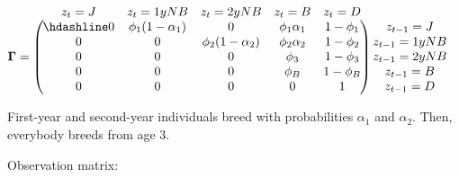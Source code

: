 \documentclass[
  12pt,
]{krantz}
\begin{document}
\[
\begin{matrix}
& \\
\mathbf{\Gamma} =
  \left ( \vphantom{ \begin{matrix} 12 \\ 12 \\ 12 \\ 12 \\ 12 \end{matrix} } \right .
          \end{matrix}
          \hspace{-1.2em}
          \begin{matrix}
          z_t=J & z_t=1yNB & z_t=2yNB & z_t=B & z_t=D \\ \hdashline
          0 & \phi_1 (1-\alpha_1) & 0 & \phi_1 \alpha_1 & 1 - \phi_1\\
          0 & 0 & \phi_2 (1-\alpha_2) & \phi_2 \alpha_2 & 1 - \phi_2\\
          0 & 0 & 0 & \phi_3 & 1 - \phi_3\\
          0 & 0 & 0 & \phi_B & 1 - \phi_B\\
          0 & 0 & 0 & 0 & 1
          \end{matrix}
          \hspace{-0.2em}
          \begin{matrix}
          & \\
          \left . \vphantom{ \begin{matrix} 12 \\ 12 \\ 12 \\ 12 \\ 12 \end{matrix} } \right )
\begin{matrix}
z_{t-1} = J \\ z_{t-1} = 1yNB \\ z_{t-1} = 2yNB \\ z_{t-1} = B \\ z_{t-1} = D
\end{matrix}
\end{matrix}
\]

First-year and second-year individuals breed with probabilities \(\alpha_1\) and \(\alpha_2\). Then, everybody breeds from age 3.

Observation matrix:
\end{document}
